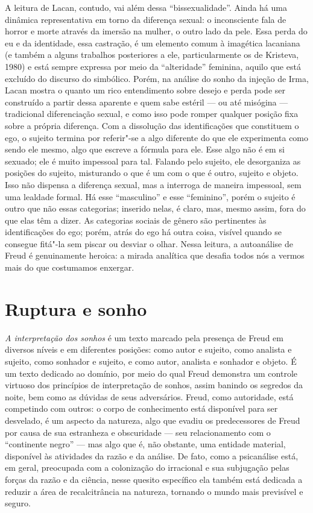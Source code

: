 A leitura de Lacan, contudo, vai além dessa ``bissexualidade''. Ainda há
uma dinâmica representativa em torno da diferença sexual: o inconsciente
fala de horror e morte através da imersão na mulher, o outro lado da
pele. Essa perda do eu e da identidade, essa castração, é um elemento
comum à imagética lacaniana (e também a alguns trabalhos posteriores a
ele, particularmente os de Kristeva, 1980) e está sempre expressa por
meio da ``alteridade'' feminina, aquilo que está excluído do discurso do
simbólico. Porém, na análise do sonho da injeção de Irma, Lacan mostra o
quanto um rico entendimento sobre desejo e perda pode ser construído a
partir dessa aparente e quem sabe estéril --- ou até misógina ---
tradicional diferenciação sexual, e como isso pode romper qualquer
posição fixa sobre a própria diferença. Com a dissolução das
identificações que constituem o ego, o sujeito termina por referir"-se a
algo diferente do que ele experimenta como sendo ele mesmo, algo que
escreve a fórmula para ele. Esse algo não é em si sexuado; ele é muito
impessoal para tal. Falando pelo sujeito, ele desorganiza as posições do
sujeito, misturando o que é um com o que é outro, sujeito e objeto. Isso
não dispensa a diferença sexual, mas a interroga de maneira impessoal,
sem uma lealdade formal. Há esse ``masculino'' e esse ``feminino'',
porém o sujeito é outro que não essas categorias; inserido nelas, é
claro, mas, mesmo assim, fora do que elas têm a dizer. As categorias
sociais de gênero são pertinentes às identificações do ego; porém, atrás
do ego há outra coisa, visível quando se consegue fitá"-la sem piscar ou
desviar o olhar. Nessa leitura, a autoanálise de Freud é genuinamente
heroica: a mirada analítica que desafia todos nós a vermos mais do que
costumamos enxergar.

\section{Ruptura e sonho}

\emph{A interpretação dos sonhos} é um texto marcado pela presença de
Freud em diversos níveis e em diferentes posições: como autor e sujeito,
como analista e sujeito, como sonhador e sujeito, e como autor, analista
e sonhador e objeto. É um texto dedicado ao domínio, por meio do qual
Freud demonstra um controle virtuoso dos princípios de interpretação de
sonhos, assim banindo os segredos da noite, bem como as dúvidas de seus
adversários. Freud, como autoridade, está competindo com outros: o corpo
de conhecimento está disponível para ser desvelado, é um aspecto da
natureza, algo que evadiu os predecessores de Freud por causa de sua
estranheza e obscuridade --- seu relacionamento com o ``continente
negro'' --- mas algo que é, não obstante, uma entidade material,
disponível às atividades da razão e da análise. De fato, como a
psicanálise está, em geral, preocupada com a colonização do irracional e
sua subjugação pelas forças da razão e da ciência, nesse quesito
específico ela também está dedicada a reduzir a área de recalcitrância
na natureza, tornando o mundo mais previsível e seguro.

